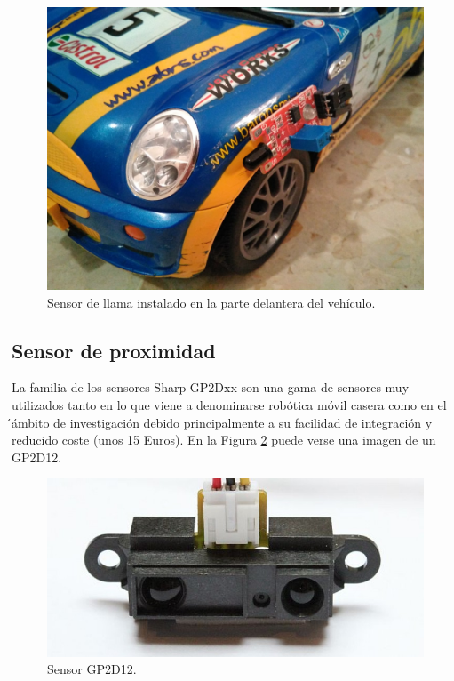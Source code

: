  \begin{figure}[H]
  \begin{center}
    \includegraphics[scale=0.2]{imagenes/robot/llama_instalado.jpg}
  \end{center}
  \caption{Sensor de llama instalado en la parte delantera del vehículo.}
  \label{figura:sensor_mq_2_potenciometro}
\end{figure}

\subsection{Sensor de proximidad}

La familia de los sensores Sharp GP2Dxx son una gama de sensores muy utilizados tanto en lo que viene a denominarse robótica móvil casera como en el ́ámbito de investigación debido
principalmente a su facilidad de integración y reducido coste (unos 15  Euros). En la Figura \ref{figura:sensor_sharp} puede verse una imagen de un GP2D12.\\

 \begin{figure}[H]
  \begin{center}
    \includegraphics[scale=0.3]{imagenes/sharp.jpg}
  \end{center}
  \caption{Sensor GP2D12.}
  \label{figura:sensor_sharp}
\end{figure}

